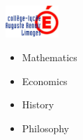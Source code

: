 \noindent
\begin{minipage}{.15\textwidth}
\centerline{\includegraphics[width=20mm]{img/renoir}}
\end{minipage}%
\hspace{5mm}
\begin{minipage}{.7\textwidth}
\raggedright
    \begin{itemize}
        \item Mathematics
        \item Economics
        \item History
        \item Philosophy
    \end{itemize}
\end{minipage}
